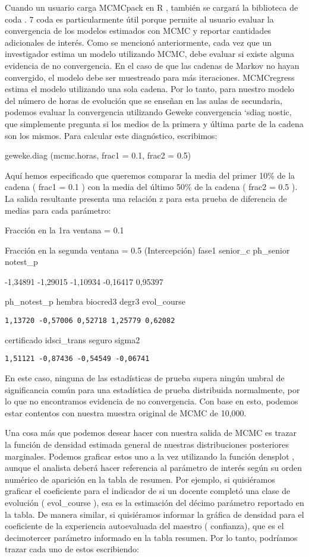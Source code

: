 \documentclass[
]{book}
\begin{document}
Cuando un usuario carga MCMCpack en R , también se cargará la biblioteca de coda . 7 coda es particularmente útil porque permite al usuario evaluar la convergencia de los modelos estimados con MCMC y reportar cantidades adicionales de interés. Como se mencionó anteriormente, cada vez que un investigador estima un modelo utilizando MCMC, debe evaluar si existe alguna evidencia de no convergencia. En el caso de que las cadenas de Markov no hayan convergido, el modelo debe ser muestreado para más iteraciones. MCMCregress estima el modelo utilizando una sola cadena. Por lo tanto, para nuestro modelo del número de horas de evolución que se enseñan en las aulas de secundaria, podemos evaluar la convergencia utilizando Geweke convergencia `sdiag nostic, que simplemente pregunta si los medios de la primera y última parte de la cadena son los mismos. Para calcular este diagnóstico, escribimos:

geweke.diag (mcmc.horas, frac1 = 0.1, frac2 = 0.5)

Aquí hemos especificado que queremos comparar la media del primer 10\% de la cadena ( frac1 = 0.1 ) con la media del último 50\% de la cadena ( frac2 = 0.5 ). La salida resultante presenta una relación z para esta prueba de diferencia de medias para cada parámetro:

Fracción en la 1ra ventana = 0.1

Fracción en la segunda ventana = 0.5 (Intercepción) fase1 senior\_c ph\_senior notest\_p

-1,34891 -1,29015 -1,10934 -0,16417 0,95397

ph\_notest\_p hembra biocred3 degr3 evol\_course

\begin{verbatim}
1,13720 -0,57006 0,52718 1,25779 0,62082
\end{verbatim}

certificado idsci\_trans seguro sigma2

\begin{verbatim}
1,51121 -0,87436 -0,54549 -0,06741
\end{verbatim}

En este caso, ninguna de las estadísticas de prueba supera ningún umbral de significancia común para una estadística de prueba distribuida normalmente, por lo que no encontramos evidencia de no convergencia. Con base en esto, podemos estar contentos con nuestra muestra original de MCMC de 10,000.

Una cosa más que podemos desear hacer con nuestra salida de MCMC es trazar la función de densidad estimada general de nuestras distribuciones posteriores marginales. Podemos graficar estos uno a la vez utilizando la función densplot , aunque el analista deberá hacer referencia al parámetro de interés según su orden numérico de aparición en la tabla de resumen. Por ejemplo, si quisiéramos graficar el coeficiente para el indicador de si un docente completó una clase de evolución ( evol\_course ), esa es la estimación del décimo parámetro reportado en la tabla. De manera similar, si quisiéramos informar la gráfica de densidad para el coeficiente de la experiencia autoevaluada del maestro ( confianza), que es el decimotercer parámetro informado en la tabla resumen. Por lo tanto, podríamos trazar cada uno de estos escribiendo:
\end{document}

